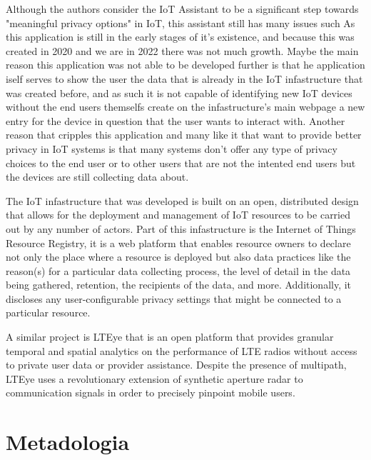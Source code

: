 \documentclass[conference]{IEEEtran}
\begin{document}
Although the authors consider the IoT Assistant to be a significant step towards
"meaningful privacy options" in IoT, this assistant still has many issues such As
this application is still in the early stages of it's existence, and because this was
created in 2020 and we are in 2022 there was not much growth. Maybe the main reason
this application was not able to be developed further is that he application iself
serves to show the user the data that is already in the IoT infastructure that was created before,
and as such it is not capable of identifying new IoT devices without the end users themselfs
create on the infastructure's main webpage \cite{DasPersonalized} a new entry for the device in question that the
user wants to interact with. Another reason that cripples this application and many like
it that want to provide better privacy in IoT systems is that many systems don't
offer any type of privacy choices to the end user or to other users that are not
the intented end users but the devices are still collecting data about.

The IoT infastructure that was developed \cite{DasPersonalized} is built on an open, distributed design
that allows for the deployment and management of IoT resources to be carried out
by any number of actors. Part of this infastructure is the Internet of Things Resource Registry,
it is a web platform that enables resource owners to declare not only the place where a
resource is deployed but also data practices like the reason(s) for a particular data collecting
process, the level of detail in the data being gathered, retention, the recipients of the data,
and more. Additionally, it discloses any user-configurable privacy settings that might be
connected to a particular resource.

A similar project is LTEye \cite{KumarLTE} that is an open
platform that provides granular temporal and spatial analytics on the performance of LTE
radios without access to private user data or provider assistance. Despite the presence of
multipath, LTEye uses a revolutionary extension of synthetic aperture radar to communication
signals in order to precisely pinpoint mobile users.

\section{Metadologia}
\end{document}
